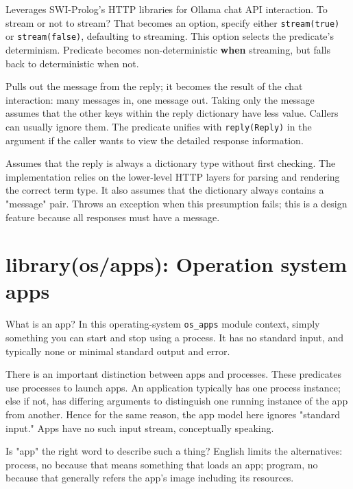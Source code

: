 \begin{description}
Leverages SWI-Prolog's HTTP libraries for Ollama chat API
interaction. To stream or not to stream? That becomes an option,
specify either \verb$stream(true)$ or \verb$stream(false)$, defaulting to
streaming. This option selects the predicate's determinism.
Predicate  becomes non-deterministic \textbf{when}
streaming, but falls back to deterministic when not.

Pulls out the message from the reply; it becomes the result of the
chat interaction: many messages in, one message out. Taking only the
message assumes that the other keys within the reply dictionary have
less value. Callers can usually ignore them. The predicate unifies
with \verb$reply(Reply)$ in the  argument if the caller wants to
view the detailed response information.

Assumes that the reply is always a dictionary type without first
checking. The implementation relies on the lower-level HTTP layers
for parsing and rendering the correct term type. It also assumes
that the dictionary always contains a "message" pair. Throws an
exception when this presumption fails; this is a design feature
because all responses must have a message.
\end{description}

\chapter{library(os/apps): Operation system apps}\label{sec:apps}

What is an app? In this operating-system \verb$os_apps$ module context,
simply something you can start and stop using a process. It has no
standard input, and typically none or minimal standard output and
error.

There is an important distinction between apps and processes. These
predicates use processes to launch apps. An application typically has
one process instance; else if not, has differing arguments to
distinguish one running instance of the app from another. Hence for
the same reason, the app model here ignores "standard input." Apps
have no such input stream, conceptually speaking.

Is "app" the right word to describe such a thing? English limits the
alternatives: process, no because that means something that loads an
app; program, no because that generally refers the app's image
including its resources.

